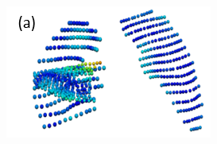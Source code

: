\documentclass[]{spie}  %
\begin{document}
{\begin{figure}[htbp] 
\centering
\begin{subfigure}{
  \begin{minipage}[t]{0.21\linewidth}
  \includegraphics[width=\linewidth,trim={{.0\wd0} {.0\wd0} {.0\wd0} {.0\wd0}},clip]{Image/QuanlititativeResult1.png} %
  \centerline{}
	\end{minipage}%
   }%
  \label{fig:QuanlititativeResult-a} 
\end{subfigure} 
\begin{subfigure}{
  \begin{minipage}[t]{0.19\linewidth}

\end{minipage}}
\end{subfigure}
\end{figure}}
\end{document}
